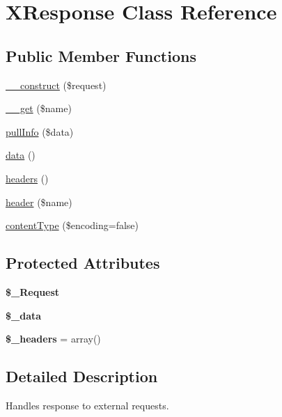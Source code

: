 \hypertarget{classXResponse}{
\section{XResponse Class Reference}
\label{classXResponse}
}
\subsection*{Public Member Functions}
\begin{DoxyCompactItemize}
\item 
\hyperlink{classXResponse_af849678ed30158fdafa5262268ac574b}{\_\-\_\-construct} (\$request)
\item 
\hyperlink{classXResponse_a24a0d2be8802d014c8d658f27acbabf3}{\_\-\_\-get} (\$name)
\item 
\hyperlink{classXResponse_a54fe154d0117afb0ab6a5b78e71ea40e}{pullInfo} (\$data)
\item 
\hyperlink{classXResponse_a9cff5d76bbba302e8c71c8d115acc95f}{data} ()
\item 
\hyperlink{classXResponse_a2217ce89a8e77e82af4ffbe824f247f5}{headers} ()
\item 
\hyperlink{classXResponse_af5f8f0b906cc013e23d021796c3b6a74}{header} (\$name)
\item 
\hyperlink{classXResponse_a9d07b3800d366327e85977b602260959}{contentType} (\$encoding=false)
\end{DoxyCompactItemize}
\subsection*{Protected Attributes}
\begin{DoxyCompactItemize}
\item 
\hypertarget{classXResponse_af50c9aade6da0fd92bed4703f8c0de08}{
{\bfseries \$\_\-Request}}
\label{classXResponse_af50c9aade6da0fd92bed4703f8c0de08}

\item 
\hypertarget{classXResponse_a91083c41b254ad9423a56d025490c360}{
{\bfseries \$\_\-data}}
\label{classXResponse_a91083c41b254ad9423a56d025490c360}

\item 
\hypertarget{classXResponse_af76024af526545dfcd82b7c2ad3709ac}{
{\bfseries \$\_\-headers} = array()}
\label{classXResponse_af76024af526545dfcd82b7c2ad3709ac}

\end{DoxyCompactItemize}


\subsection{Detailed Description}
Handles response to external requests. 

